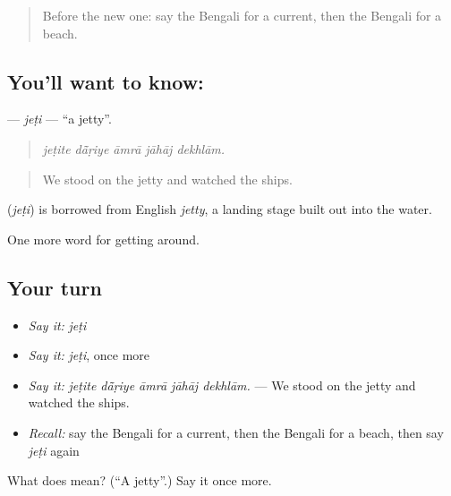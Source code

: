 \label{lesson:BN-C398-jeti}



\begin{quote}
Before the new one: say the Bengali for a current, then the Bengali for a beach.
\end{quote}

\subsection*{You'll want to know: }
\textbf{} — \emph{jeṭi} — \textquotedblleft{}a jetty\textquotedblright{}.

\begin{quote}
    
\end{quote}

\begin{quote}
\emph{jeṭite dā̃ṛiye āmrā jāhāj dekhlām.}
\end{quote}

\begin{quote}
We stood on the jetty and watched the ships.
\end{quote}

\begin{cousinweb}
\textbf{} (\emph{jeṭi}) is borrowed from English \emph{jetty}, a landing stage built out into the water.
\end{cousinweb}

\begin{grammarlens}[title={What you've built}]
One more word for getting around.
\end{grammarlens}

\subsection*{Your turn}
\begin{itemize}
\raggedright
  \item \emph{Say it:} \emph{jeṭi}
  \item \emph{Say it:} \emph{jeṭi}, once more
  \item \emph{Say it:} \emph{jeṭite dā̃ṛiye āmrā jāhāj dekhlām.} — We stood on the jetty and watched the ships.
  \item \emph{Recall:} say the Bengali for a current, then the Bengali for a beach, then say \emph{jeṭi} again
\end{itemize}

\begin{tcolorbox}[breakable,colback=teal!4,colframe=teal!35!black,title={Before you move on}]
What does  mean? (\textquotedblleft{}A jetty\textquotedblright{}.) Say it once more.
\end{tcolorbox}

